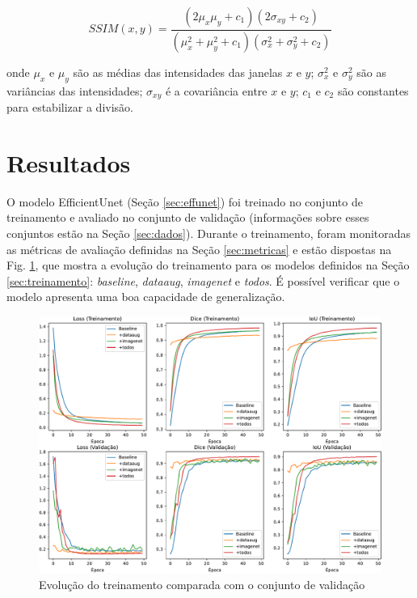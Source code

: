 \documentclass[a4,12pt]{horizon-theme}
\begin{document}
\begin{equation}\label{eq:ssim}
  SSIM(x, y) = \frac{(2\mu_x\mu_y + c_1)(2\sigma_{xy} + c_2)}{(\mu_x^2 + \mu_y^2 + c_1)(\sigma_x^2 + \sigma_y^2 + c_2)}
\end{equation}

onde $\mu_x$ e $\mu_y$ são as médias das intensidades das janelas $x$ e $y$; $\sigma_x^2$ e $\sigma_y^2$ são as variâncias das intensidades; $\sigma_{xy}$ é a covariância entre $x$ e $y$; $c_1$  e $c_2$ são constantes para estabilizar a divisão.



\section{Resultados}
O modelo EfficientUnet (Seção \ref{sec:effunet}) foi treinado no conjunto de treinamento e avaliado no conjunto de validação (informações sobre esses conjuntos estão na Seção \ref{sec:dados}). Durante o treinamento, foram monitoradas as métricas de avaliação definidas na Seção \ref{sec:metricas} e estão dispostas na Fig. \ref{fig:eval}, que mostra a evolução do treinamento para os modelos definidos na Seção \ref{sec:treinamento}: \emph{baseline}, \emph{dataaug}, \emph{imagenet} e \emph{todos}. É possível verificar que o modelo apresenta uma boa capacidade de generalização.

\begin{figure}[!ht]
  \includegraphics[width=\textwidth]{figures/eval.pdf}
  \caption{Evolução do treinamento comparada com o conjunto de validação}
  \label{fig:eval}
\end{figure}
\end{document}
